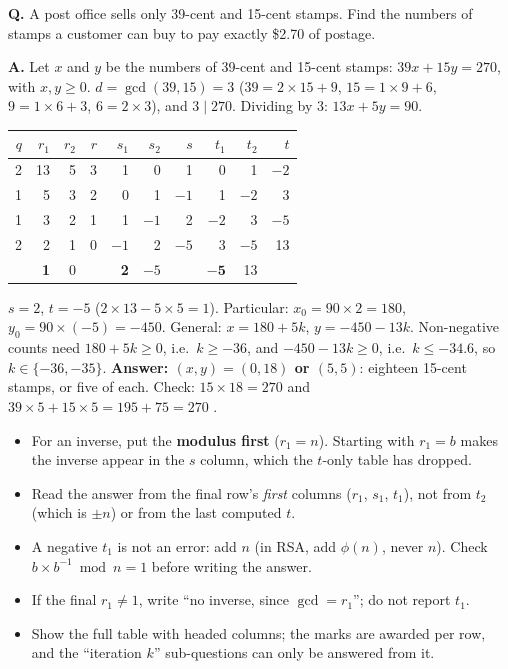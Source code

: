 \begin{worked}
\textbf{Q.} A post office sells only 39-cent and 15-cent stamps. Find the numbers of stamps a customer can buy to pay exactly \$2.70 of postage.

\textbf{A.} Let $x$ and $y$ be the numbers of 39-cent and 15-cent stamps: $39x + 15y = 270$, with $x, y \ge 0$. $d = \gcd(39, 15) = 3$ ($39 = 2 \times 15 + 9$, $15 = 1 \times 9 + 6$, $9 = 1 \times 6 + 3$, $6 = 2 \times 3$), and $3 \mid 270$. Dividing by 3: $13x + 5y = 90$.
\begin{center}\small
\begin{tabular}{@{}r|rrr|rrr|rrr@{}}
\toprule
$q$ & $r_1$ & $r_2$ & $r$ & $s_1$ & $s_2$ & $s$ & $t_1$ & $t_2$ & $t$\\
\midrule
2 & 13 & 5 & 3 & 1 & 0 & 1 & 0 & 1 & $-2$\\
1 & 5 & 3 & 2 & 0 & 1 & $-1$ & 1 & $-2$ & 3\\
1 & 3 & 2 & 1 & 1 & $-1$ & 2 & $-2$ & 3 & $-5$\\
2 & 2 & 1 & 0 & $-1$ & 2 & $-5$ & 3 & $-5$ & 13\\
 & \textbf{1} & 0 & & \textbf{2} & $-5$ & & $\mathbf{-5}$ & 13 & \\
\bottomrule
\end{tabular}
\end{center}
$s = 2$, $t = -5$ ($2 \times 13 - 5 \times 5 = 1$). Particular: $x_0 = 90 \times 2 = 180$, $y_0 = 90 \times (-5) = -450$. General: $x = 180 + 5k$, $y = -450 - 13k$.
Non-negative counts need $180 + 5k \ge 0$, i.e.\ $k \ge -36$, and $-450 - 13k \ge 0$, i.e.\ $k \le -34.6$, so $k \in \{-36, -35\}$.
\textbf{Answer: $(x, y) = (0, 18)$ or $(5, 5)$}: eighteen 15-cent stamps, or five of each. Check: $15 \times 18 = 270$ and $39 \times 5 + 15 \times 5 = 195 + 75 = 270$ \checkmark.
\end{worked}

\begin{trap}
\begin{itemize}[leftmargin=1.5em]
  \item For an inverse, put the \textbf{modulus first} ($r_1 = n$). Starting with $r_1 = b$ makes the inverse appear in the $s$ column, which the $t$-only table has dropped.
  \item Read the answer from the final row's \emph{first} columns ($r_1$, $s_1$, $t_1$), not from $t_2$ (which is $\pm n$) or from the last computed $t$.
  \item A negative $t_1$ is not an error: add $n$ (in RSA, add $\phi(n)$, never $n$). Check $b \times b^{-1} \bmod n = 1$ before writing the answer.
  \item If the final $r_1 \ne 1$, write ``no inverse, since $\gcd = r_1$''; do not report $t_1$.
  \item Show the full table with headed columns; the marks are awarded per row, and the ``iteration $k$'' sub-questions can only be answered from it.
\end{itemize}
\end{trap}

